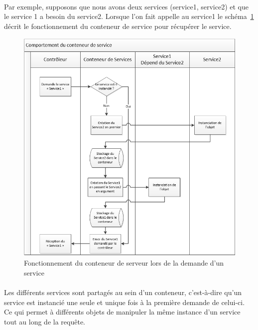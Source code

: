 \paragraph{}
Par exemple, supposons que nous avons deux services (service1, service2) et que le service 1 a besoin du service2. Lorsque l'on fait appelle au service1 le schéma~\ref{conteneur} décrit le fonctionnement du conteneur de service pour récupérer le service.
		\begin{figure}[H]
        \begin{center}
          \includegraphics[scale=0.8]{images/conteneur_service}
        \end{center}
        \caption{Fonctionnement du conteneur de serveur lors de la demande d'un service}
        \label{conteneur}
      \end{figure}

\paragraph{}
Les différents services sont partagés au sein d'un conteneur, c'est-à-dire qu'un service est instancié une seule et unique fois à la première demande de celui-ci. Ce qui permet à différents objets de manipuler la même instance d'un service tout au long de la requête.
